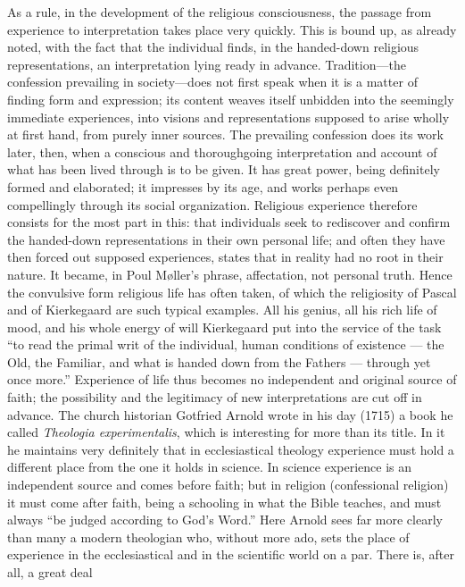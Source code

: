 \documentclass[12pt,a4paper]{article}
\newcommand{\opage}[1]{\marginnote{\footnotesize\textit{[#1]}}}
\begin{document}
As a rule, in the development of the religious consciousness, the passage from
experience to interpretation takes place very quickly. This is bound up, as already
noted, with the fact that the individual finds, in the handed-down religious
representations, an interpretation lying ready in advance. Tradition---the confession
prevailing in society---does not first speak when it is a matter of finding form and
expression; its content weaves itself unbidden into the seemingly immediate
experiences, into visions and representations supposed to arise wholly at first hand,
from purely inner sources. The prevailing confession does its work later, then, when a
conscious and thoroughgoing interpretation and account of what has been lived through
is to be given. It has great power, being definitely formed and elaborated; it
impresses by its age, and works perhaps even compellingly through its social
organization. Religious experience therefore consists for the most part in this: that
individuals seek to rediscover and confirm the handed-down representations in their own
personal life; and often they have then forced out supposed \opage{52}experiences, states that in
reality had no root in their nature. It became, in Poul Møller's phrase, affectation,
not personal truth. Hence the convulsive form religious life has often taken, of which
the religiosity of Pascal and of Kierkegaard are such typical examples. All his genius,
all his rich life of mood, and his whole energy of will Kierkegaard put into the
service of the task ``to read the primal writ of the individual, human conditions of
existence --- the Old, the Familiar, and what is handed down from the Fathers ---
through yet once more.'' Experience of life thus becomes no independent and original
source of faith; the possibility and the legitimacy of new interpretations are cut off
in advance. The
church historian Gotfried Arnold wrote in his day (1715) a book he called
\emph{Theologia experimentalis}, which is interesting for more than its title. In it
he maintains very definitely that in ecclesiastical theology experience must hold a
different place from the one it holds in science. In science experience is an
independent source and comes before faith; but in religion (confessional religion) it
must come after faith, being a schooling in what the Bible teaches, and must always
``be judged according to God's Word.'' Here Arnold sees far more clearly than many a
modern theologian who, without more ado, sets the place of experience in the
ecclesiastical and in the scientific world on a par. There is, after all, a great deal
\end{document}
